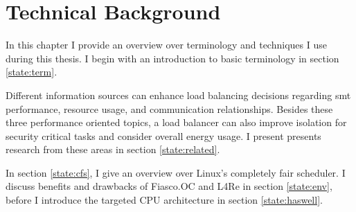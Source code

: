 \chapter{Technical Background}
\label{sec:state}







In this chapter I provide an overview over terminology and techniques I use
during this thesis.
I begin with an introduction to basic terminology in section \ref{state:term}.

Different information sources can enhance load balancing decisions regarding
\gls{smt} performance, resource usage, and communication relationships.
Besides these three performance oriented topics, a load balancer can also
improve isolation for security critical tasks and consider overall energy
usage.
I present presents research from these areas in section \ref{state:related}.

In section \ref{state:cfs}, I give an overview over Linux's completely fair
scheduler.
I discuss benefits and drawbacks of Fiasco.OC and L4Re in section
\ref{state:env}, before I introduce the targeted CPU architecture in section
\ref{state:haswell}.













\cleardoublepage

